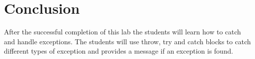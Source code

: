 \section{Conclusion}

After the successful completion of this lab the students will learn how to catch and handle exceptions. The students will use throw, try and catch blocks to catch different types of exception and provides a message if an exception is found. 
